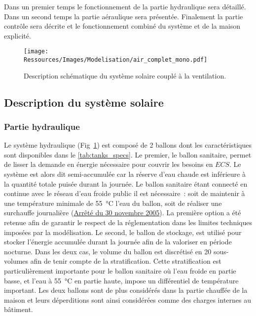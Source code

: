 Dans un premier temps le fonctionnement de la partie hydraulique sera détaillé. Dans un
second temps la partie aéraulique sera présentée. Finalement la partie contrôle sera
décrite et le fonctionnement combiné du système et de la maison explicité.

\begin{figure}
    \begin{center}
        \texttt{[image: Ressources/Images/Modelisation/air\_complet\_mono.pdf]}
    \end{center}
    \caption{Description schématique du système solaire couplé à la ventilation.
             \label{fig:air_complet_mono}}
\end{figure}




\subsection{Description du système solaire} %
\label{sub:description_du_systeme_solaire}
\subsubsection{Partie hydraulique} %
\label{ssub:partie_hyraulique}
Le système hydraulique (Fig~\ref{fig:air_complet_mono}) est composé de 2 ballons dont les
caractéristiques sont disponibles dans le \autoref{tab:tanks_specs}. Le premier, le ballon
sanitaire, permet de lisser la demande en énergie nécessaire pour couvrir les besoins en
$ECS$. Le système est alors dit semi-accumulée car la réserve d’eau chaude est inférieure
à la quantité totale puisée durant la journée. Le ballon sanitaire étant connecté en
continue avec le réseau d’eau froide public il est nécessaire~: soit de maintenir
à une température minimale de \SI{55}{\celsius} l’eau du ballon, soit de réaliser une surchauffe journalière
(\href{https://www.legifrance.gouv.fr/affichTexte.do?cidTexte=JORFTEXT000000423756}{Arrêté
du 30 novembre 2005}). La première option a été retenue afin de garantir le respect de la
réglementation dans les limites techniques imposées par la modélisation. Le second, le
ballon de stockage, est utilisé pour stocker l’énergie accumulée durant la journée afin de
la valoriser en période nocturne. Dans les deux cas, le volume du ballon est discrétisé en
20 sous-volumes afin de tenir compte de la stratification. Cette stratification est
particulièrement importante pour le ballon sanitaire où l’eau froide en partie basse, et
l’eau à \SI{55}{\celsius} en partie haute, impose un différentiel de température
important. Les deux ballons sont de plus considérés dans la partie chauffée de la maison
et leurs déperditions sont ainsi considérées comme des charges internes au bâtiment.

